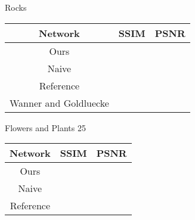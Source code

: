 \documentclass[10pt,twocolumn,letterpaper]{article}
\begin{document}
\begin{center}
Rocks

\begin{tabular}{|c c c|}
    Network & SSIM & PSNR \\ \hline
    Ours & & \\
    Naive & & \\
    Reference &  & \\ 
    Wanner and Goldluecke & & 
\end{tabular}
\end{center}


\begin{center}
Flowers and Plants 25

\begin{tabular}{|c c c|}
    Network & SSIM & PSNR \\ \hline
    Ours & & \\
    Naive & & \\
    Reference &  & \\ 
\end{tabular}
\end{center}


{\small


}
\end{document}
